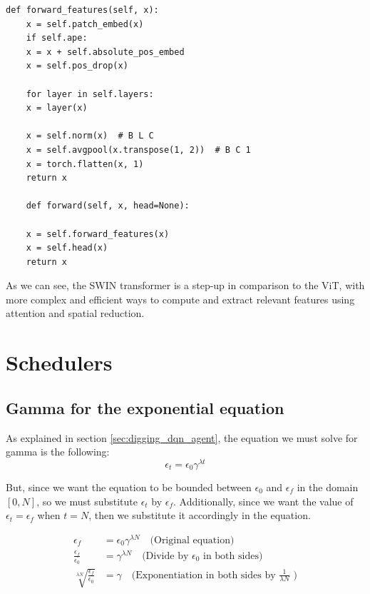 \begin{lstlisting}[caption={Forward method for the SWIN Transformer}, label={code:forward_swin}]
	def forward_features(self, x):
	x = self.patch_embed(x)
	if self.ape:
	x = x + self.absolute_pos_embed
	x = self.pos_drop(x)
	
	for layer in self.layers:
	x = layer(x)
	
	x = self.norm(x)  # B L C
	x = self.avgpool(x.transpose(1, 2))  # B C 1
	x = torch.flatten(x, 1)
	return x
	
	def forward(self, x, head=None):
	
	x = self.forward_features(x)
	x = self.head(x)
	return x
\end{lstlisting}

As we can see, the SWIN transformer is a step-up in comparison to the ViT, with more complex and efficient ways to compute and extract relevant features using attention and spatial reduction.

\chapter{Schedulers}
\label{app:gamma_proof}

\section{Gamma for the exponential equation}
As explained in section \ref{sec:digging_dqn_agent}, the equation we must solve for gamma is the following: 
\begin{equation}
	\epsilon_t = \epsilon_0 \gamma^{\lambda t}
\end{equation}

But, since we want the equation to be bounded between $\epsilon_0$ and $\epsilon_f$ in the domain $[0, N]$, so we must substitute $\epsilon_t$ by $\epsilon_f$. Additionally, since we want the value of $\epsilon_t = \epsilon_f$ when $t = N$, then we substitute it accordingly in the equation.

\begin{align}
	\epsilon_f &=  \epsilon_0 \gamma^{\lambda N} \quad \text{(Original equation)} \label{eq1} \\
	\frac{\epsilon_f}{\epsilon_0} &= \gamma^{\lambda N} \quad \text{(Divide by $\epsilon_0$ in both sides)} \label{eq2} \\
	\sqrt[\lambda N]{\frac{\epsilon_f}{\epsilon_0}} &= \gamma \quad \text{(Exponentiation in both sides by $\frac{1}{\lambda N}$ )} \label{eq3} 
\end{align}

